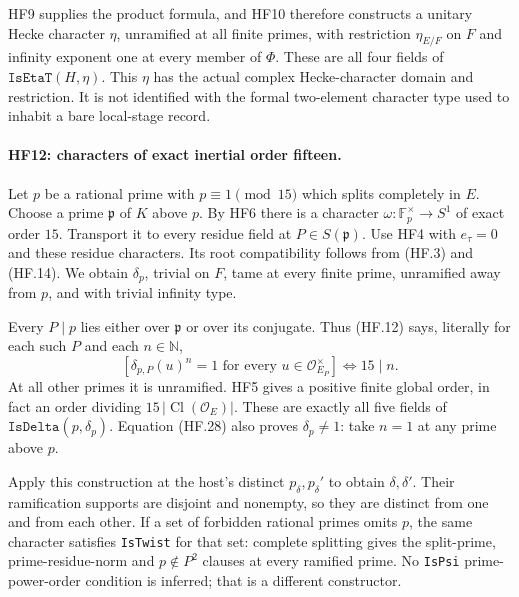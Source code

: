 HF9 supplies the product formula, and HF10 therefore
constructs a unitary Hecke character $\eta$, unramified
at all finite primes, with restriction $\eta_{E/F}$
on $F$ and infinity exponent one at every member of
$\Phi$. These are all four fields of
$\texttt{IsEtaT}(H,\eta)$.
This $\eta$ has the actual complex Hecke-character
domain and restriction. It is not identified with the
formal two-element character type used to inhabit a
bare local-stage record.

\paragraph{HF12: characters of exact inertial order fifteen.}
Let $p$ be a rational prime with $p\equiv1\pmod{15}$
which splits completely in $E$. Choose a prime
$\mathfrak p$ of $K$ above $p$. By HF6 there is a
character $\omega:\mathbb F_p^\times\to S^1$
of exact order $15$. Transport it to every residue
field at $P\in S(\mathfrak p)$.
Use HF4 with $e_\tau=0$ and these residue characters.
Its root compatibility follows from (HF.3) and
(HF.14). We obtain $\delta_p$, trivial on $F$,
tame at every finite prime, unramified away from $p$,
and with trivial infinity type.

Every $P\mid p$ lies either over $\mathfrak p$ or over
its conjugate. Thus (HF.12) says, literally for each
such $P$ and each $n\in\mathbb N$,
\[
 \left[\delta_{p,P}(u)^n=1
                 \text{ for every }u\in\mathcal O_{E_P}^\times\right]
                      \Longleftrightarrow 15\mid n.   \tag{HF.28}
\]
At all other primes it is unramified. HF5 gives a
positive finite global order, in fact an order dividing
$15\,|\operatorname{Cl}(\mathcal O_E)|$.
These are exactly all five fields of
$\texttt{IsDelta}(p,\delta_p)$.
Equation (HF.28) also proves $\delta_p\ne1$: take
$n=1$ at any prime above $p$.

Apply this construction at the host's distinct
$p_\delta,p_\delta'$ to obtain $\delta,\delta'$.
Their ramification supports are disjoint and nonempty,
so they are distinct from one and from each other.
If a set of forbidden rational primes omits $p$,
the same character satisfies \texttt{IsTwist} for that
set: complete splitting gives the split-prime,
prime-residue-norm and $p\notin P^2$ clauses at every
ramified prime. No \texttt{IsPsi} prime-power-order
condition is inferred; that is a different constructor.

